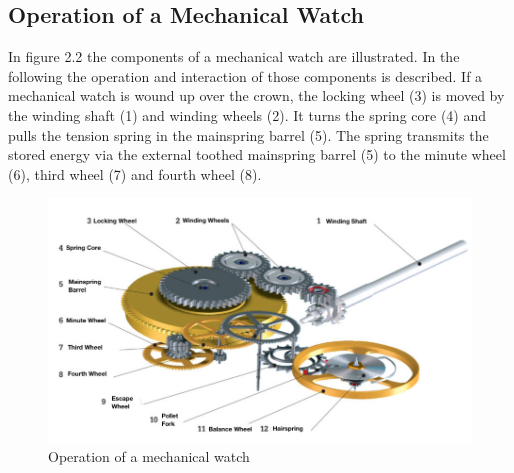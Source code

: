 \documentclass[12pt, a4paper]{report}
\begin{document}
    \subsection{Operation of a Mechanical Watch}  
    In figure 2.2 the components of a mechanical watch are illustrated. In the following the operation and interaction of those components is described.
    If a mechanical watch is wound up over the crown, the locking wheel (3) is moved by the winding shaft (1) and winding wheels (2). It turns the spring core (4) and pulls the tension spring in the mainspring barrel (5). The spring transmits the stored energy via the external toothed mainspring barrel (5) to the minute wheel (6), third wheel (7) and fourth wheel (8). 
    \newline
    \noindent
    \begin{figure}[H]
    \centering
    \includegraphics[scale=0.45]{Images/Funktionsweise-Uhrwerk.jpg}
    
    \caption{Operation of a mechanical watch \cite{Uhrwerk}}
    \end{figure}
    
\end{document}
